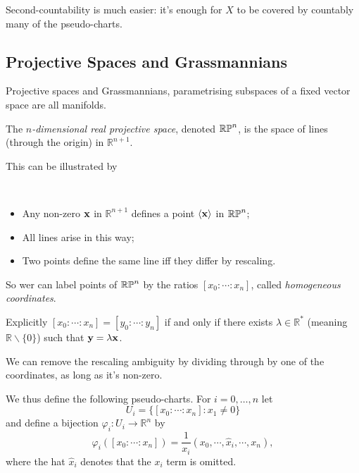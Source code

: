 \documentclass[a4paper,11pt]{article}
\begin{document}
	Second-countability is much easier: it's enough for $X$ to be covered by countably many of the pseudo-charts.

	\subsection{Projective Spaces and Grassmannians} 

	Projective spaces and Grassmannians, parametrising subspaces of a fixed vector space are all manifolds.

	\begin{defi}
		The \emph{$n$-dimensional real projective space}, denoted $\mathbb{RP}^{n}$, is the space of lines (through the origin) in $\mathbb{R}^{n+1}$.
	\end{defi}
	
	This can be illustrated by 

	\begin{nt}
		\
		\begin{itemize}
			\item Any non-zero $\vb x$ in $\mathbb{R}^{n+1}$ defines a point $\expval{\vb x}$ in $\mathbb{RP}^{n}$;
			\item All lines arise in this way;
			\item Two points define the same line iff they differ by rescaling.
		\end{itemize}
	\end{nt}

	So wer can label points of $\mathbb{RP}^{n}$ by the ratios $[x_0 : \cdots : x_n]$, called \emph{homogeneous coordinates}.

	Explicitly $[x_0 : \cdots : x_n] = [y_0 : \cdots : y_n]$ if and only if there exists $\lambda \in \mathbb{R}^*$ (meaning $\mathbb{R} \backslash \{0\}$) such that $\vb y = \lambda \vb x$.

	We can remove the rescaling ambiguity by dividing through by one of the coordinates, as long as it's non-zero.

	We thus define the following pseudo-charts. For $i = 0, \dots, n$ let 
	\[
		U_i = \{[x_0 : \cdots : x_n] : x_1 \neq 0\}
	\]
	and define a bijection $\varphi_i : U_i \to \mathbb{R}^n$ by
	\[
		\varphi_i ([x_0 : \cdots : x_n]) = \frac{1}{x_i}(x_0, \cdots, \hat{x}_i, \cdots , x_n),
	\]
	where the hat $\hat{x}_i$ denotes that the $x_i$ term is omitted.
\end{document}

